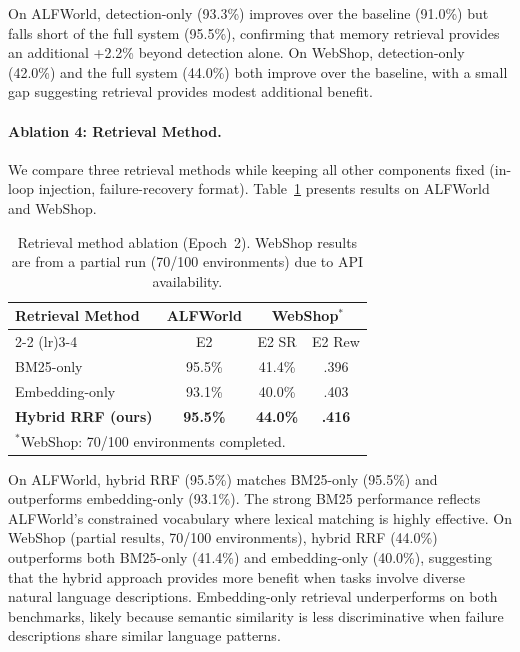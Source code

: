 On ALFWorld, detection-only (93.3\%) improves over the baseline (91.0\%) but falls short of the full system (95.5\%), confirming that memory retrieval provides an additional +2.2\% beyond detection alone. On WebShop, detection-only (42.0\%) and the full system (44.0\%) both improve over the baseline, with a small gap suggesting retrieval provides modest additional benefit.

\paragraph{Ablation 4: Retrieval Method.}
We compare three retrieval methods while keeping all other components fixed (in-loop injection, failure-recovery format). Table~\ref{tab:retrieval_ablation} presents results on ALFWorld and WebShop.

\begin{table}[h]
\centering
\caption{Retrieval method ablation (Epoch~2). WebShop results are from a partial run (70/100 environments) due to API availability.}
\label{tab:retrieval_ablation}
\small
\begin{tabular}{lccc}
\toprule
\multirow{2}{*}{Retrieval Method} & ALFWorld & \multicolumn{2}{c}{WebShop$^*$} \\
\cmidrule(lr){2-2} \cmidrule(lr){3-4}
 & E2 & E2 SR & E2 Rew \\
\midrule
BM25-only & 95.5\% & 41.4\% & .396 \\
Embedding-only & 93.1\% & 40.0\% & .403 \\
\textbf{Hybrid RRF (ours)} & \textbf{95.5\%} & \textbf{44.0\%} & \textbf{.416} \\
\bottomrule
\multicolumn{4}{l}{\footnotesize $^*$WebShop: 70/100 environments completed.}
\end{tabular}
\end{table}

On ALFWorld, hybrid RRF (95.5\%) matches BM25-only (95.5\%) and outperforms embedding-only (93.1\%). The strong BM25 performance reflects ALFWorld's constrained vocabulary where lexical matching is highly effective. On WebShop (partial results, 70/100 environments), hybrid RRF (44.0\%) outperforms both BM25-only (41.4\%) and embedding-only (40.0\%), suggesting that the hybrid approach provides more benefit when tasks involve diverse natural language descriptions. Embedding-only retrieval underperforms on both benchmarks, likely because semantic similarity is less discriminative when failure descriptions share similar language patterns.

